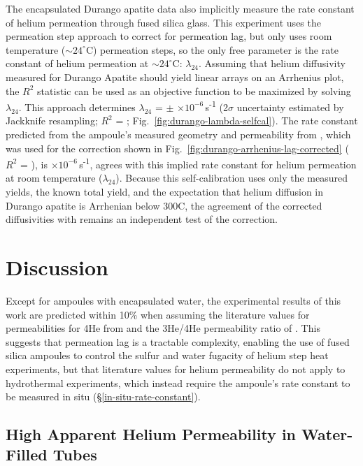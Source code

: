 The encapsulated Durango apatite data also implicitly measure the rate constant of helium permeation through fused silica glass. This experiment uses the permeation step approach to correct for permeation lag, but only uses room temperature ($\sim24^{\circ}$C) permeation steps, so the only free parameter is the rate constant of helium permeation at $\sim24^{\circ}$C: $\lambda_{24}$. Assuming that helium diffusivity measured for Durango Apatite should yield linear arrays on an Arrhenius plot, the $R^2$ statistic can be used as an objective function to be maximized by solving $\lambda_{24}$. This approach determines \(\lambda_{24}\) = \PaperLamTwentyFourData{} \(\pm\) \PaperLamTwentyFourDataTwoSigma{} \(\times 10^{-6}\)\,s\textsuperscript{-1} (2$\sigma$ uncertainty estimated by Jackknife resampling; \(R^{2}\) = \PaperDurangoRtwoMax; Fig.~\ref{fig:durango-lambda-selfcal}). The rate constant predicted from the ampoule's measured geometry and permeability from \citet{swets1961}, which was used for the correction shown in Fig.~\ref{fig:durango-arrhenius-lag-corrected} (\(R^{2}\) = \PaperDurangoRtwoPred), is \PaperLamTwentyFourPred{} \(\times 10^{-6}\)\,s\textsuperscript{-1}, agrees with this implied rate constant for helium permeation at room temperature ($\lambda_{24}$). Because this self-calibration uses only the measured yields, the known total yield, and the expectation that helium diffusion in Durango apatite is Arrhenian below 300\textdegree C, the agreement of the corrected diffusivities with \citet{farley2000} remains an independent test of the correction.

\section{Discussion}\label{discussion}

Except for ampoules with encapsulated water, the experimental results of this work are predicted within 10\% when assuming the literature values for permeabilities for 4He from \citet{swets1961} and the 3He/4He permeability ratio of \citet{jones1953}. This suggests that permeation lag is a tractable complexity, enabling the use of fused silica ampoules to control the sulfur and water fugacity of helium step heat experiments, but that literature values for helium permeability do not apply to hydrothermal experiments, which instead require the ampoule's rate constant to be measured in situ (\S\ref{in-situ-rate-constant}).

\subsection{High Apparent Helium Permeability in Water-Filled Tubes}\label{resolving-the-paradoxically-high-apparent-helium-permeability-in-water-filled-tubes}

